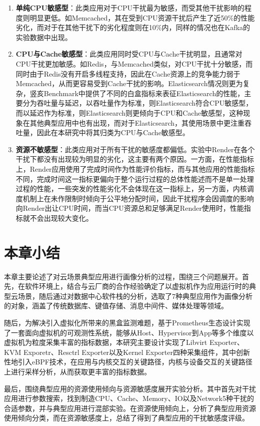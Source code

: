 \begin{enumerate}
    \item \textbf{单纯CPU敏感型}：此类应用对于CPU干扰最为敏感，而受其他干扰影响的程度则明显更低。如Memcached，其在受到CPU资源干扰后产生了近50\%的性能劣化，而对于在其他干扰下的劣化程度则在10\%内，同样的情况也在Kafka的实验数据中出现。
    \item \textbf{CPU与Cache敏感型}：此类应用同时受CPU与Cache干扰明显，且通常对CPU干扰更加敏感。如Redis，与Memcached类似，对CPU干扰十分敏感，而同时由于Redis没有开启多线程支持，因此在Cache资源上的竞争能力弱于Memcached，从而更容易受到Cache干扰的影响。Elasticsearch情况则更为复杂，竖亥Benchmark中提供了不同的白盒指标来表征Elasticsearch的性能，主要分为吞吐量与延迟，以吞吐量作为标准，则Elasticsearch符合CPU敏感型，而以延迟作为标准，则Elasticsearch则更倾向于CPU和Cache敏感型，这种现象在其他典型应用中也有出现，而对于Elasticsearch，其使用场景中更注重吞吐量，因此在本研究中将其归类为CPU与Cache敏感型。
    \item \textbf{资源不敏感型}：此类应用对于所有干扰的敏感度都偏低。实验中Render在各个干扰下都没有出现较为明显的劣化，这主要有两个原因。一方面，在性能指标上，Render应用使用了完成时间作为性能评价指标，而与其他应用的性能指标不同，完成时间这一指标更偏向于整个运行过程的总体性能述而不是单一处理过程的性能，一些突发的性能劣化不会体现在这一指标上，另一方面，内核调度机制上在未作限制时倾向于公平地分配时间，因此干扰程序会因调度的影响向Render出让CPU时间，而当CPU资源总和足够满足Render使用时，性能指标就不会出现较大变化。
\end{enumerate}

\section{本章小结}

本章主要论述了对云场景典型应用进行画像分析的过程，围绕三个问题展开。首先，在软件环境上，结合与云厂商的合作经验确定了以虚拟机作为应用运行时的典型云场景，随后通过对数据中心软件栈的分析，选取了7种典型应用作为画像分析的对象，涵盖了传统数据库、键值存储、消息中间件、媒体处理等领域。

随后，为解决引入虚拟化所带来的黑盒监测难题，基于Prometheus生态设计实现了一套面向虚拟机的可观测性系统，能够从Host、Hypervisor到App等多个维度以虚拟机为粒度采集丰富的指标数据，本研究主要设计实现了Libvirt Exporter、KVM Exporetr、Resctrl Exporter以及Kernel Exporter四种采集组件，其中创新性地引入eBPF技术，在应用与内核交互的关键路径，内核与设备交互的关键路径上进行采样分析，从而获取更丰富的指标数据。

最后，围绕典型应用的资源使用倾向与资源敏感度展开实验分析。其中首先对干扰应用进行参数搜索，找到制造CPU、Cache、Memory、IO以及Network5种干扰的合适参数，并与典型应用进行混部实验。在资源使用倾向上，分析了典型应用资源使用倾向分类，而在资源敏感度上，总结了得到了典型应用的干扰敏感度评级。